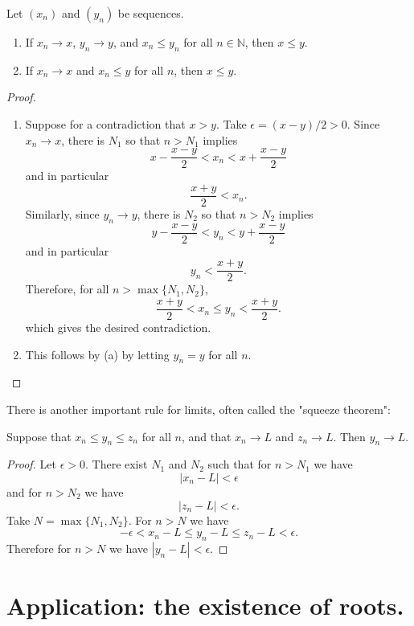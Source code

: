 \documentclass[11pt,dvipsnames]{book}
\numberwithin{figure}{section} %
\numberwithin{table}{section} %
\begin{document}
\begin{proposition}
\label{p:x_n<y_n}
Let $(x_{n})$ and $(y_{n})$ be sequences.
\begin{enumerate}[label=(\alph*)]
\item  If $x_{n}\rightarrow x$, $y_{n}\rightarrow y$, and $x_{n}\leq y_{n}$ for all $n\in\mathbb{N}$, then $x\leq y$.
\item If $x_n\rightarrow x$ and $x_{n}\leq y$ for all $n$, then $x\leq y$.
\end{enumerate}
\end{proposition}

\begin{proof}
\begin{enumerate}[label=(\alph*)]
\item  Suppose for a contradiction that $x>y$. Take $\epsilon = (x-y)/2 > 0$. Since $x_{n}\rightarrow x$, there is $N_{1}$ so that $n > N_{1}$ implies
\[
x-\frac{x-y}{2}<x_{n}<x+\frac{x-y}{2}
\]
and in particular
\[
\frac{x+y}{2}<x_{n}.
\]
Similarly, since $y_{n}\rightarrow y$, there is $N_{2}$ so that $n > N_{2}$ implies
\[
y-\frac{x-y}{2}<y_{n}<y+\frac{x-y}{2}
\]
and in particular
\[
y_{n}<\frac{x+y}{2}.
\]
Therefore, for all $n>  \max\{N_{1},N_{2}\}$,
\[
\frac{x+y}{2}<x_{n} \leq y_n < \frac{x+y}{2}.
\]
which gives the desired contradiction.

\item This follows by (a) by letting $y_{n}=y$ for all $n$.
\end{enumerate}
\end{proof}

There is another important rule for limits, often called the "squeeze theorem":

\begin{proposition}\label{squeeze}
Suppose that $x_n \leq y_n \leq z_n$ for all $n$, and that $x_n \to L$ and $z_n \to L$. Then $y_n \to L$.
\end{proposition}

\begin{proof}
Let $\epsilon > 0$. There exist $N_1$ and $N_2$ such that for $n > N_1$ we have
\[ |x_n - L| < \epsilon\]
and for $n > N_2$ we have
\[ |z_n - L| < \epsilon.\]
Take $N = \max\{N_1, N_2\}$. For $n > N$ we have
\[ - \epsilon < x_n - L \leq y_n - L \leq z_n - L < \epsilon.\]
Therefore for $n > N$ we have $|y_n - L| < \epsilon$.
\end{proof}

\section{Application: the existence of roots.}
\end{document}
